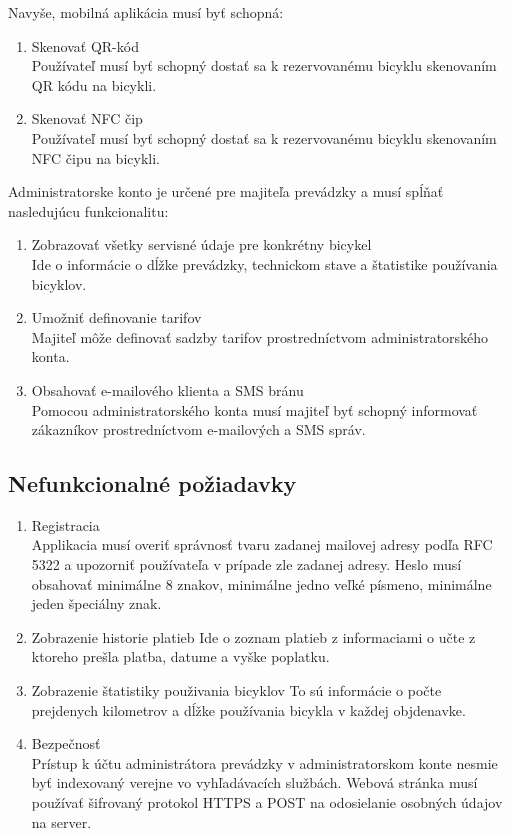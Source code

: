 \documentclass[12pt]{report}
\begin{document}
Navyše, mobilná aplikácia musí byť schopná:

\begin{enumerate}
    \item Skenovať QR-kód \\
        Používateľ musí byť schopný dostať sa k rezervovanému bicyklu skenovaním QR kódu na bicykli.
        
    \item Skenovať NFC čip \\
        Používateľ musí byť schopný dostať sa k rezervovanému bicyklu skenovaním NFC čipu na bicykli.
\end{enumerate}

Administratorske konto je určené pre majiteľa prevádzky a musí spĺňať nasledujúcu funkcionalitu:

\begin{enumerate}
    \item Zobrazovať všetky servisné údaje pre konkrétny bicykel \\
        Ide o informácie o dĺžke prevádzky, technickom stave a štatistike používania bicyklov.
        
    \item Umožniť definovanie tarifov \\
        Majiteľ môže definovať sadzby tarifov prostredníctvom administratorského konta.
        
    \item Obsahovať e-mailového klienta a SMS bránu \\
        Pomocou administratorského konta musí majiteľ byť schopný informovať zákazníkov prostredníctvom 
        e-mailových a SMS správ.

\end{enumerate}

\subsection{Nefunkcionalné požiadavky}

\begin{enumerate}
    \item Registracia \\
	      Applikacia musí overiť správnosť tvaru zadanej mailovej adresy podľa RFC 5322 
        a upozorniť používateľa v prípade zle zadanej adresy. Heslo musí obsahovať minimálne 8 
        znakov, minimálne jedno veľké písmeno, minimálne jeden špeciálny znak.

    \item Zobrazenie historie platieb
        Ide o zoznam platieb z informaciami o učte z ktoreho prešla platba, datume a vyške poplatku.
    \item Zobrazenie štatistiky použivania bicyklov
        To sú informácie o počte prejdenych kilometrov a dĺžke používania bicykla v každej objdenavke.
    \item Bezpečnosť\\
        Prístup k účtu administrátora prevádzky v administratorskom konte nesmie byť indexovaný verejne vo
        vyhľadávacích službách. Webová stránka musí používať šifrovaný protokol HTTPS a POST na odosielanie osobných 
        údajov na server.
\end{enumerate}
\end{document}
